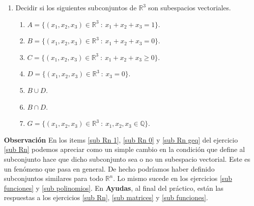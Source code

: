 \begin{enumerate}[topsep=6pt, itemsep=.4cm]

    


\item\label{sub Rn} Decidir si los siguientes subconjuntos de $\mathbb{R}^3$ son subespacios vectoriales.


    \begin{enumerate}
        \item\label{sub Rn 1} $A=\{(x_1, x_2 ,x_3) \in \mathbb{R}^3 \ : \ x_1 + x_2 + x_3=1\}$.
        \item\label{sub Rn 0} $B=\{(x_1, x_2 ,x_3) \in \mathbb{R}^3 \ : \ x_1 + x_2 + x_3=0\}$.
        \item\label{sub Rn geq} $C=\{(x_1, x_2 ,x_3) \in \mathbb{R}^3 \ : \ x_1 + x_2 + x_3 \geq 0\}$.
        \item\label{sub Rn 1 30} $D=\{(x_1, x_2 ,x_3) \in \mathbb{R}^3 \ : \ x_3=0\}$.
        \item\label{sub Rn cup} $B\cup D$.
        \item\label{sub Rn cap} $B\cap D$.
        \item\label{sub Rn q} $G=\{(x_1, x_2 ,x_3) \in \mathbb{R}^3 \ :\ x_1, x_2, x_3\in\mathbb{Q}\}$.
    \end{enumerate}
\end{enumerate}

\textbf{Observación} En los items \ref{sub Rn 1}, \ref{sub Rn 0} y \ref{sub Rn geq} del ejercicio \ref{sub Rn} podemos apreciar como un simple cambio en la condición que define al subconjunto hace que dicho subconjunto sea o no un subespacio vectorial. Este es un fenómeno que pasa en general. De hecho podríamos haber definido subconjuntos similares para todo $\mathbb{R}^n$. Lo mismo sucede en los ejercicios \ref{sub funciones} y \ref{sub polinomios}.
En {\bf Ayudas},  al final del práctico, están las respuestas a los ejercicios \ref{sub Rn}, \ref{sub matrices} y \ref{sub funciones}. 
        
